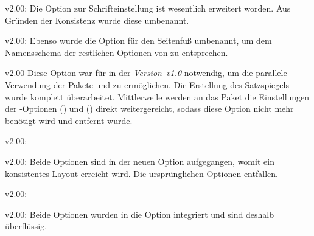 \begin{Obsolete}{v2.00:}
  {}
\printobsoletelist%
%
Die Option zur Schrifteinstellung ist wesentlich erweitert worden. Aus Gründen 
der Konsistenz wurde diese umbenannt.
\end{Obsolete}

\begin{Obsolete}{v2.00:}
  {}
\printobsoletelist%
%
Ebenso wurde die Option für den Seitenfuß umbenannt, um dem Namensschema der 
restlichen Optionen von \TUDScript zu entsprechen.
\end{Obsolete}

\begin{Obsolete}{v2.00}
  {}
  {}
\printobsoletelist%
%
Diese Option war für \TUDScript in der \emph{Version~v1.0} notwendig, um die 
parallele Verwendung der Pakete  und  
zu ermöglichen. Die Erstellung des Satzspiegels wurde komplett überarbeitet. 
Mittlerweile werden an das Paket  die Einstellungen der 
\KOMAScript-Optionen () und 
() direkt weitergereicht, sodass diese 
Option nicht mehr benötigt wird und entfernt wurde.
\end{Obsolete}

\begin{Obsolete}{v2.00:}
  {}
\begin{Obsolete}{v2.00:}
  {}
\printobsoletelist%
%
Beide Optionen sind in der neuen Option  
aufgegangen, womit ein konsistentes Layout erreicht wird. Die ursprünglichen 
Optionen entfallen. 
\end{Obsolete}
\end{Obsolete}

\begin{Obsolete}{v2.00:}
  {}
\begin{Obsolete}{v2.00:}
  {}
\printobsoletelist%
%
Beide Optionen wurden in die Option  integriert und sind 
deshalb überflüssig.
\end{Obsolete}
\end{Obsolete}

